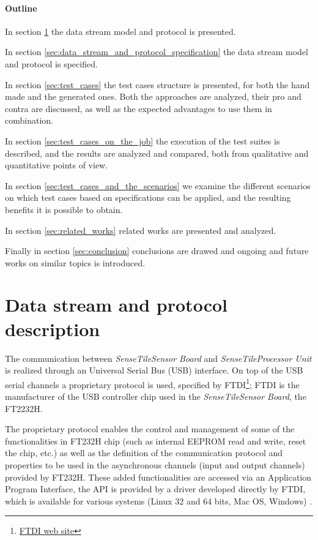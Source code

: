 \documentclass{article}
\newcommand{\myhref}[2]{\ifpdf\href{#1}{#2}\else\htmladdnormallinkfoot{#2}{#1}\fi}
\newcommand{\ST}{\emph{SenseTile}\xspace}
\newcommand{\STSB}{\ST \emph{Sensor Board}\xspace}
\newcommand{\STPU}{\ST \emph{Processor Unit}\xspace}
\begin{document}
\paragraph*{Outline}

In section \ref{sec:data_stream_and_protocol_description} the data stream model 
and protocol is presented.

In section \ref{sec:data_stream_and_protocol_specification} the data stream model 
and protocol is specified.

In section \ref{sec:test_cases} the test cases structure is presented, for 
both the hand made and the generated ones. 
Both the approaches are analyzed, their pro and contra are discussed, as 
well as the expected advantages to use them in combination.

In section \ref{sec:test_cases_on_the_job} the execution of the test suites
is described, and the results are analyzed and compared, both from qualitative
and quantitative points of view.

In section \ref{sec:test_cases_and_the_scenarios} we examine the different 
scenarios on which test cases based on specifications can be applied, and 
the resulting benefits it is possible to obtain.

In section \ref{sec:related_works} related works are presented and analyzed.

Finally in section \ref{sec:conclusion} conclusions are drawed and 
ongoing and future works on similar topics is introduced.



\section{Data stream and protocol description}
\label{sec:data_stream_and_protocol_description}

The communication between \STSB and \STPU is realized through an Universal 
Serial Bus (USB) interface.
On top of the USB serial channels a proprietary protocol is used, specified by 
FTDI\footnote{\myhref{http://www.ftdichip.com/}{FTDI web site}}; FTDI is the 
manufacturer of the USB controller chip used in the \STSB, the 
FT2232H\cite{ftdi_ft232h_2009}.

The proprietary protocol enables the control and management of some of the 
functionalities in FT232H chip (such as internal EEPROM read and write, reset 
the chip, etc.) as well as the definition of the communication protocol and 
properties to be used in the asynchronous channels (input and output channels) 
provided by FT232H.
These added functionalities are accessed via an Application Program Interface,
the API is provided by a driver developed directly by FTDI, which is available 
for various systems (Linux 32 and 64 bits, Mac OS, Windows)
\cite{ftdi_d2xx_api_2009}.
\end{document}
